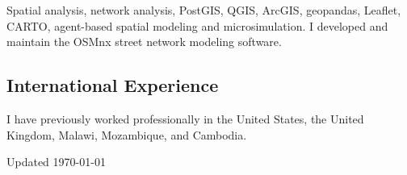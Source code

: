 \documentclass[12pt,letterpaper]{report}
\newcommand{\listitemspace}{0.15em}
\renewenvironment{itemize}
{\begin{list}{}{\setlength{\leftmargin}{0em}
			\setlength{\parskip}{0em}
			\setlength{\itemsep}{\listitemspace}
			\setlength{\parsep}{\listitemspace}}}
	{\end{list}}
\begin{document}
	\begin{itemize}
		
		\item Spatial analysis, network analysis, PostGIS, QGIS, ArcGIS, geopandas, Leaflet, CARTO, agent-based spatial modeling and microsimulation. I developed and maintain the OSMnx street network modeling software.
		
	\end{itemize}
	
	\subsection*{International Experience}
	
	\begin{itemize}
		
		\item I have previously worked professionally in the United States, the United Kingdom, Malawi, Mozambique, and Cambodia.
		
	\end{itemize}
	
	
	
	\begin{center}
		\vspace{6em}
		Updated \monthyeardate\today
	\end{center}
	
	
	
\end{document}
